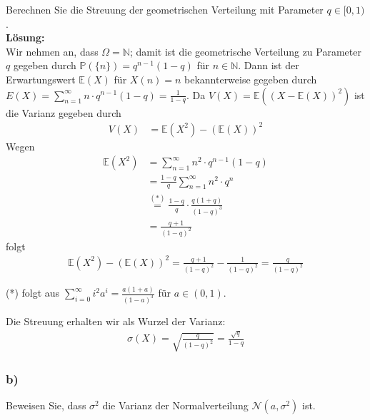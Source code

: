 \documentclass[11pt,a4paper,ngerman]{article}
\newcommand{\set}[1]{ \{ #1 \}}
\newcommand{\Prob}{\mathbb{P}}
\begin{document}
Berechnen Sie die Streuung der geometrischen Verteilung mit Parameter $q \in [0,1)$.\\
\textbf{Lösung:}\\
Wir nehmen an, dass $\Omega = \mathbb{N}$; damit ist die geometrische Verteilung zu Parameter $q$ gegeben durch $\Prob(\set{n}) = q^{n-1}(1-q)$ für $n \in \mathbb{N}$.
Dann ist der Erwartungswert $\mathbb{E}(X)$ für $X(n) = n$ bekannterweise gegeben durch $E(X) = \sum_{n=1}^\infty n \cdot q^{n-1}(1-q) = \frac{1}{1-q}$.
Da $V(X) = \mathbb{E}((X - \mathbb{E}(X))^2)$ ist die Varianz gegeben durch
\begin{equation*}\begin{split}
V(X) &=  \mathbb{E}(X^2) -   (\mathbb{E}(X))^2  
\end{split}\end{equation*}
Wegen
\begin{equation*}\begin{split}
\mathbb{E}(X^2) &=  \sum_{n=1}^\infty n^2 \cdot q^{n-1}(1-q) \\
&= \frac{1-q}{q} \sum_{n=1}^\infty n^2 \cdot q^{n}  \\
&\stackrel{(*)}{=}  \frac{1-q}{q} \cdot \frac{q(1+q)}{(1-q)^3}  \\
&= \frac{q+1}{(1-q)^2}
\end{split}\end{equation*}
folgt
\begin{equation*}\begin{split}
\mathbb{E}(X^2) -   (\mathbb{E}(X))^2  = \frac{q+1}{(1-q)^2} -  \frac{1}{(1-q)^2} = \frac{q}{(1-q)^2}
\end{split}\end{equation*}

(*) folgt aus $\sum_{i=0}^\infty i^2 a^i = \frac{a (1+a)}{(1-a)^3}$ für $a \in (0,1)$.

Die Streuung erhalten wir als Wurzel der Varianz:
\begin{equation*}\begin{split}
\sigma(X) = \sqrt{ \frac{q}{(1-q)^2}} =  \frac{\sqrt{q}}{1-q}
\end{split}\end{equation*}



\subsubsection*{b)}

Beweisen Sie, dass $\sigma^2$ die Varianz der Normalverteilung $\mathcal{N}(a,\sigma^2)$ ist.\\
\end{document}
